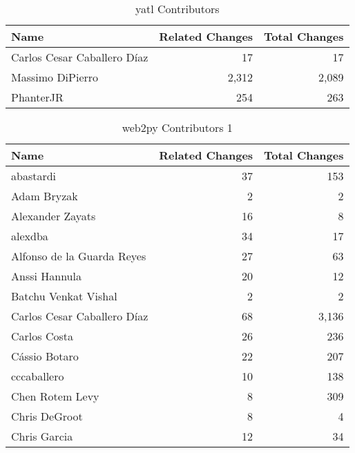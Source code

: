 \documentclass[a4paper,man,natbib,floatsintext]{apa6}
\begin{document}
\begin{table}[ht]
\caption{yatl Contributors}
\label{tab:contribs-4}
\begin{tabular}{|l|r|r|}
\hline
Name                           & Related Changes & Total Changes \\ \hline
Carlos Cesar Caballero Díaz    & 17              & 17            \\ \hline
Massimo DiPierro               & 2,312           & 2,089         \\ \hline
PhanterJR                      & 254             & 263           \\ \hline
\end{tabular}
\end{table}

\begin{table}[ht]
\caption{web2py Contributors 1}
\label{tab:contribs-3-1}
\begin{tabular}{|l|r|r|}
\hline
Name                           & Related Changes & Total Changes \\ \hline
abastardi                      & 37              & 153           \\ \hline
Adam Bryzak                    & 2               & 2             \\ \hline
Alexander Zayats               & 16              & 8             \\ \hline
alexdba                        & 34              & 17            \\ \hline
Alfonso de la Guarda Reyes     & 27              & 63            \\ \hline
Anssi Hannula                  & 20              & 12            \\ \hline
Batchu Venkat Vishal           & 2               & 2             \\ \hline
Carlos Cesar Caballero Díaz    & 68              & 3,136         \\ \hline
Carlos Costa                   & 26              & 236           \\ \hline
Cássio Botaro                  & 22              & 207           \\ \hline
cccaballero                    & 10              & 138           \\ \hline
Chen Rotem Levy                & 8               & 309           \\ \hline
Chris DeGroot                  & 8               & 4             \\ \hline
Chris Garcia                   & 12              & 34            \\ \hline

\end{tabular}
\end{table}
\end{document}
